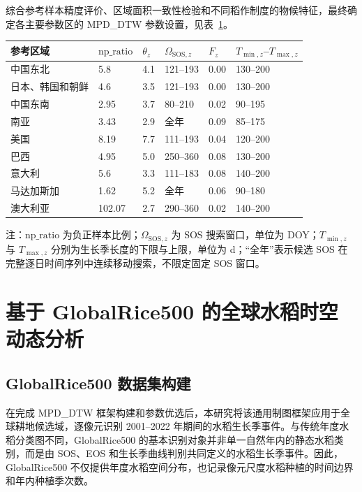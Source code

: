综合参考样本精度评价、区域面积一致性检验和不同稻作制度的物候特征，最终确定各主要参数区的 MPD\_DTW 参数设置，见表~\ref{tab:mpd_dtw_parameters}。

\begin{table}[htbp]
    \centering
    \label{tab:mpd_dtw_parameters}
    \begin{tabular}{@{}p{}p{}p{}p{}p{}p{}@{}}
        \toprule
        参考区域 & \(\mathrm{np\_ratio}\) & \(\theta_z\) & \(\Omega_{\mathrm{SOS},z}\) & \(F_z\) & \(T_{\min,z}\)--\(T_{\max,z}\) \\
        \midrule
        中国东北 & 5.8 & 4.1 & 121--193 & 0.00 & 130--200 \\
        日本、韩国和朝鲜 & 4.6 & 3.5 & 121--193 & 0.00 & 130--200 \\
        中国东南 & 2.95 & 3.7 & 80--210 & 0.02 & 90--195 \\
        南亚 & 3.43 & 2.9 & 全年 & 0.09 & 85--175 \\
        美国 & 8.19 & 7.7 & 111--193 & 0.04 & 120--200 \\
        巴西 & 4.95 & 5.0 & 250--360 & 0.08 & 130--200 \\
        意大利 & 5.6 & 3.3 & 111--183 & 0.08 & 140--200 \\
        马达加斯加 & 1.62 & 5.2 & 全年 & 0.06 & 90--180 \\
        澳大利亚 & 102.07 & 2.7 & 290--360 & 0.02 & 140--200 \\
        \bottomrule
    \end{tabular}

    \vspace{0.5em}
    \noindent
    {\footnotesize\raggedright
    注：\(\mathrm{np\_ratio}\) 为负正样本比例；\(\Omega_{\mathrm{SOS},z}\) 为 SOS 搜索窗口，单位为 DOY；\(T_{\min,z}\) 与 \(T_{\max,z}\) 分别为生长季长度的下限与上限，单位为 d；“全年”表示候选 SOS 在完整逐日时间序列中连续移动搜索，不限定固定 SOS 窗口。\par}
\end{table}


\section{基于 GlobalRice500 的全球水稻时空动态分析}

\subsection{GlobalRice500 数据集构建}
在完成 MPD_DTW 框架构建和参数优选后，本研究将该通用制图框架应用于全球耕地候选域，逐像元识别 2001–2022 年期间的水稻生长季事件。与传统年度水稻分类图不同，GlobalRice500 的基本识别对象并非单一自然年内的静态水稻类别，而是由 SOS、EOS 和生长季曲线判别共同定义的水稻生长季事件。因此，GlobalRice500 不仅提供年度水稻空间分布，也记录像元尺度水稻种植的时间边界和年内种植季次数。

